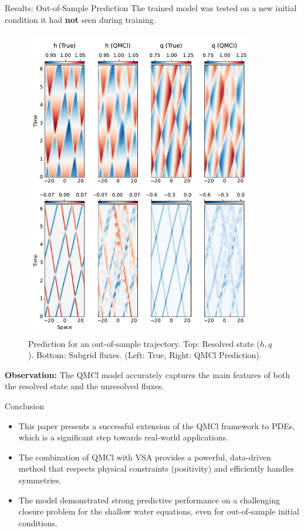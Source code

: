 \documentclass{beamer}
\begin{document}
\begin{frame}{Results: Out-of-Sample Prediction}
    The trained model was tested on a new initial condition it had \textbf{not} seen during training.
    \begin{figure}
        \includegraphics[width=0.9\textwidth]{paper/res01a.pdf}
        \caption{Prediction for an out-of-sample trajectory. Top: Resolved state ($h, q$). Bottom: Subgrid fluxes. (Left: True, Right: QMCl Prediction).}
        \label{fig:res01a}
    \end{figure}
    \textbf{Observation:} The QMCl model accurately captures the main features of both the resolved state and the unresolved fluxes.
\end{frame}

\begin{frame}{Conclusion}
    \begin{itemize}
        \item This paper presents a successful extension of the QMCl framework to PDEs, which is a significant step towards real-world applications.
        \vspace{0.5cm}
        \item The combination of QMCl with VSA provides a powerful, data-driven method that respects physical constraints (positivity) and efficiently handles symmetries.
        \vspace{0.5cm}
        \item The model demonstrated strong predictive performance on a challenging closure problem for the shallow water equations, even for out-of-sample initial conditions.
    \end{itemize}
\end{frame}
\end{document}
